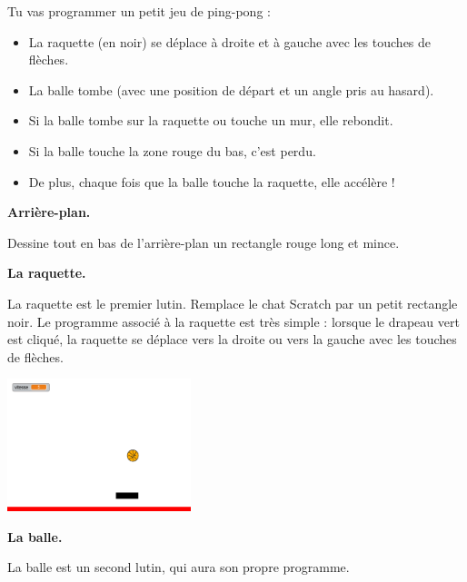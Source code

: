 \documentclass[class=report,crop=false, 12pt]{standalone}
\begin{document}
\begin{activite}

Tu vas programmer un petit jeu de ping-pong :
\begin{itemize}
  \item La raquette (en noir) se déplace à droite et à gauche avec les touches de flèches.
  \item La balle tombe (avec une position de départ et un angle pris au hasard).
  \item Si la balle tombe sur la raquette ou touche un mur, elle rebondit.
  \item Si la balle touche la zone rouge du bas, c'est perdu.
  \item De plus, chaque fois que la balle touche la raquette, elle accélère !
\end{itemize}


\bigskip
\textbf{Arrière-plan.}

Dessine tout en bas de l'arrière-plan un rectangle rouge long et mince.

\bigskip
\textbf{La raquette.}

La raquette est le premier lutin. Remplace le chat Scratch par un petit rectangle noir. %
Le programme associé à la raquette est très simple : lorsque le drapeau vert est cliqué, 
la raquette se déplace vers la droite ou vers la gauche avec les touches de flèches.

\bigskip

\begin{center}
  \includegraphics[width=0.4\textwidth]{ecran-06-ex3} 
\end{center}


\textbf{La balle.}

La balle est un second lutin, qui aura son propre programme.


\end{activite}
\end{document}
